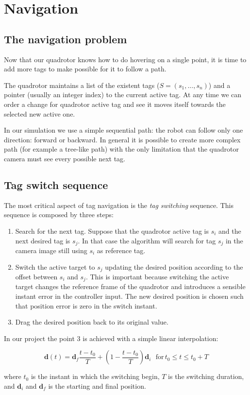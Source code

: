 \section{Navigation}

\subsection{The navigation problem}

Now that our quadrotor knows how to do hovering on a single point, it is time to
add more tags to make possible for it to follow a path.

The quadrotor maintains a list of the existent tags ($S = (s_1,...,s_n)$) and
a pointer (usually an integer index) to the current active tag. At any time we
can order a change for quadrotor active tag and see it moves itself towards the 
selected new active one.

In our simulation we use a simple sequential path: the robot can follow only
one direction: forward or backward. In general it is possible to create more
complex path (for example a tree-like path) with the only limitation that the 
quadrotor camera must see every possible next tag.

\subsection{Tag switch sequence}

The most critical aspect of tag navigation is the \emph{tag switching}
sequence. This sequence is composed by three steps:

\begin{enumerate}
    \item Search for the next tag. Suppose that the quadrotor active tag is
        $s_i$ and the next desired tag is $s_j$. In that case the algorithm
        will search for tag $s_j$ in the camera image still using $s_i$ as
        reference tag.
    \item Switch the active target to $s_j$ updating the desired position
        according to the offset between $s_i$ and $s_j$. This is important
        because switching the active target changes the reference frame of the
        quadrotor and introduces a sensible instant error in the controller
        input. The new desired position is chosen such that position error is
        zero in the switch instant.
    \item Drag the desired position back to its original value.
\end{enumerate}

In our project the point 3 is achieved with a simple linear interpolation:

\begin{equation}
    \boldsymbol{d}(t) = \boldsymbol{d}_f \frac{t-t_0}{T} + (1-\frac{t-t_0}{T})\boldsymbol{d}_i\:\:\: \text{for}\, t_0 \le t \le t_0+T
\end{equation}

where $t_0$ is the instant in which the switching begin, $T$ is the switching
duration, and $\boldsymbol{d}_i$ and $\boldsymbol{d}_f$ is the starting and
final position.

